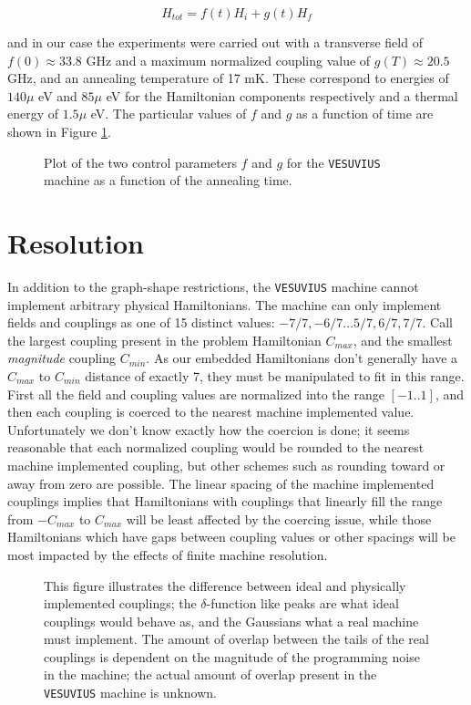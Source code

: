 \begin{displaymath}
	H_{tot} = f(t)H_i + g(t)H_f
\end{displaymath}

and in our case the experiments were carried out with a transverse field of $f(0) \approx 33.8 $ GHz and a maximum normalized coupling value of $g(T) \approx 20.5$ GHz, and an annealing temperature of 17 mK.  These correspond to energies of $140 \mu$ eV and $85 \mu$ eV for the Hamiltonian components respectively and a thermal energy of $1.5 \mu$ eV.  The particular values of $f$ and $g$ as a function of time are shown in Figure \ref{fig:trajectory}.

\begin{figure}
	\caption[\texttt{VESUVIUS Evolution Trajectory}]{Plot of the two control parameters $f$ and $g$ for the \texttt{VESUVIUS} machine as a function of the annealing time.}
	\label{fig:trajectory}
\end{figure}

\section{Resolution}
\label{sec:resolution}
In addition to the graph-shape restrictions, the \texttt{VESUVIUS} machine cannot implement arbitrary physical Hamiltonians.  The machine can only implement fields and couplings as one of 15 distinct values: $-7/7, -6/7 \dots 5/7,6/7, 7/7$.  Call the largest coupling present in the problem Hamiltonian $C_{max}$, and the smallest \emph{magnitude} coupling $C_{min}$.  As our embedded Hamiltonians don't generally have a $C_{max}$ to $C_{min}$ distance of exactly 7, they must be manipulated to fit in this range.
First  all the field and coupling values are normalized into the range $[-1..1]$, and then each coupling is coerced to the nearest machine implemented value.
Unfortunately we don't know exactly how the coercion is done; it seems reasonable that each normalized coupling would be rounded to the nearest machine implemented coupling, but other schemes such as rounding toward or away from zero are possible.
The linear spacing of the machine implemented couplings implies that Hamiltonians with couplings that linearly fill the range from $-C_{max}$ to $C_{max}$ will be least affected by the coercing issue, while those Hamiltonians which have gaps between coupling values or other spacings will be most impacted by the effects of finite machine resolution.

\begin{figure}
	\caption[Ideal vs. Physical Couplings]{This figure illustrates the difference between ideal and physically implemented couplings; the $\delta$-function like peaks are what ideal couplings would behave as, and the Gaussians what a real machine must implement.  The amount of overlap between the tails of the real couplings is dependent on the magnitude of the programming noise in the machine; the actual amount of overlap present in the \texttt{VESUVIUS} machine is unknown.}
	\label{fig:coupling_spread}
\end{figure}

